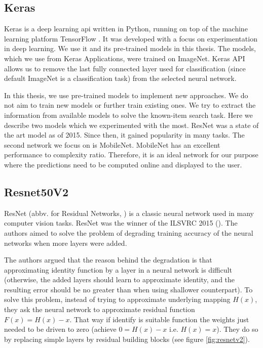 \subsection{Keras}

Keras \citep{chollet2015keras} is a deep learning \acrshort{api} written in Python, running on top of the machine learning platform TensorFlow \citep{tensorflow2015-whitepaper}. It was developed with a focus on experimentation in deep learning. We use it and its pre-trained models in this thesis. The models, which we use from Keras Applications, were trained on ImageNet. Keras API allows us to remove the last fully connected layer used for classification (since default ImageNet is a classification task) from the selected neural network.

In this thesis, we use pre-trained models to implement new approaches. We do not aim to train new models or further train existing ones. We try to extract the information from available models to solve the known-item search task. Here we describe two models which we experimented with the most. ResNet was a state of the art model as of 2015. Since then, it gained popularity in many tasks. The second network we focus on is MobileNet. MobileNet has an excellent performance to complexity ratio. Therefore, it is an ideal network for our purpose where the predictions need to be computed online and displayed to the user.

\subsection*{Resnet50V2}

ResNet (abbv. for Residual Networks, \cite{resnet}) is a classic neural network used in many computer vision tasks. ResNet was the winner of the ILSVRC 2015 (\citep{ILSVRC15}). The authors aimed to solve the problem of degrading training accuracy of the neural networks when more layers were added. 

The authors argued that the reason behind the degradation is that approximating identity function by a layer in a neural network is difficult (otherwise, the added layers should learn to approximate identity, and the resulting error should be no greater than when using shallower counterpart). To solve this problem, instead of trying to approximate underlying mapping $H(x)$, they ask the neural network to approximate residual function $F(x)=H(x) - x$. That way if identify is suitable function the weights just needed to be driven to zero (achieve $0 = H(x) - x$ i.e. $H(x) = x$). They do so by replacing simple layers by residual building blocks (see figure \ref{fig:resnetv2}).

